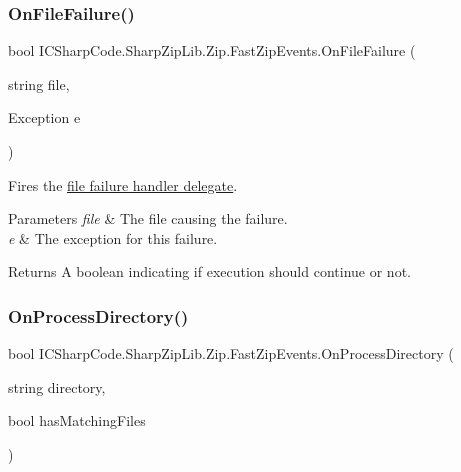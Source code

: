 \subsubsection{\texorpdfstring{On\+File\+Failure()}{OnFileFailure()}}
{\footnotesize\ttfamily bool I\+C\+Sharp\+Code.\+Sharp\+Zip\+Lib.\+Zip.\+Fast\+Zip\+Events.\+On\+File\+Failure (\begin{DoxyParamCaption}\item[{string}]{file,  }\item[{Exception}]{e }\end{DoxyParamCaption})\hspace{0.3cm}{\ttfamily [inline]}}



Fires the \hyperlink{class_i_c_sharp_code_1_1_sharp_zip_lib_1_1_zip_1_1_fast_zip_events_ae1451c8ef2694b3606c436a6769b917d}{file failure handler delegate}. 


\begin{DoxyParams}{Parameters}
{\em file} & The file causing the failure.\\
\hline
{\em e} & The exception for this failure.\\
\hline
\end{DoxyParams}
\begin{DoxyReturn}{Returns}
A boolean indicating if execution should continue or not.
\end{DoxyReturn}
\mbox{\label{class_i_c_sharp_code_1_1_sharp_zip_lib_1_1_zip_1_1_fast_zip_events_ac662ee939e011224cb3cd20dec9e5e10}} 
\subsubsection{\texorpdfstring{On\+Process\+Directory()}{OnProcessDirectory()}}
{\footnotesize\ttfamily bool I\+C\+Sharp\+Code.\+Sharp\+Zip\+Lib.\+Zip.\+Fast\+Zip\+Events.\+On\+Process\+Directory (\begin{DoxyParamCaption}\item[{string}]{directory,  }\item[{bool}]{has\+Matching\+Files }\end{DoxyParamCaption})\hspace{0.3cm}{\ttfamily [inline]}}



